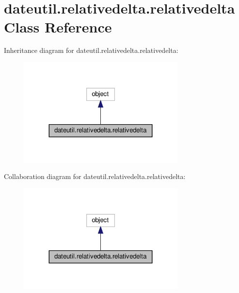 \hypertarget{classdateutil_1_1relativedelta_1_1relativedelta}{}\section{dateutil.\+relativedelta.\+relativedelta Class Reference}
\label{classdateutil_1_1relativedelta_1_1relativedelta}


Inheritance diagram for dateutil.\+relativedelta.\+relativedelta\+:
\nopagebreak
\begin{figure}[H]
\begin{center}
\leavevmode
\includegraphics[width=239pt]{classdateutil_1_1relativedelta_1_1relativedelta__inherit__graph}
\end{center}
\end{figure}


Collaboration diagram for dateutil.\+relativedelta.\+relativedelta\+:
\nopagebreak
\begin{figure}[H]
\begin{center}
\leavevmode
\includegraphics[width=239pt]{classdateutil_1_1relativedelta_1_1relativedelta__coll__graph}
\end{center}
\end{figure}
